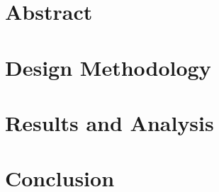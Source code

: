 \documentclass[CMPE]{KGCOEReport}
\begin{document}
\maketitle

\section*{Abstract}

\section*{Design Methodology}

\section*{Results and Analysis}

\section*{Conclusion}
\end{document}
